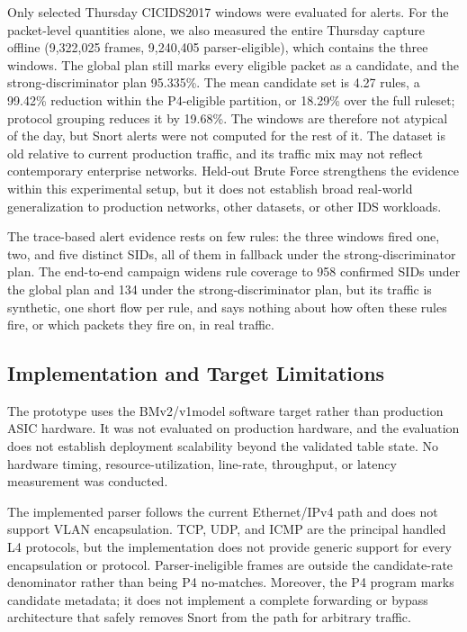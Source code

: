\documentclass{article}
\begin{document}
Only selected Thursday CICIDS2017 windows were evaluated for alerts. For the
packet-level quantities alone, we also measured the entire Thursday capture
offline (9,322,025 frames, 9,240,405 parser-eligible), which contains the
three windows. The global plan still marks every eligible packet as a
candidate, and the strong-discriminator plan 95.335\%. The mean candidate set
is 4.27 rules, a 99.42\% reduction within the P4-eligible partition, or
18.29\% over the full ruleset; protocol grouping reduces it by 19.68\%. The
windows are therefore not atypical of the day, but Snort alerts were not
computed for the rest of it. The dataset is old relative to current
production traffic, and its traffic mix may not reflect contemporary
enterprise networks. Held-out Brute Force strengthens the evidence within
this experimental setup, but it does not establish broad real-world
generalization to production networks, other datasets, or other IDS
workloads.

The trace-based alert evidence rests on few rules: the three windows fired
one, two, and five distinct SIDs, all of them in fallback under the
strong-discriminator plan. The end-to-end campaign widens rule coverage to
958 confirmed SIDs under the global plan and 134 under the
strong-discriminator plan, but its traffic is synthetic, one short flow per
rule, and says nothing about how often these rules fire, or which packets
they fire on, in real traffic.

\subsection{Implementation and Target Limitations}
The prototype uses the BMv2/v1model software target rather than production
ASIC hardware. It was not evaluated on production hardware, and the
evaluation does not establish deployment scalability beyond the validated
table state. No hardware timing, resource-utilization, line-rate, throughput,
or latency measurement was conducted.

The implemented parser follows the current Ethernet/IPv4 path and does not
support VLAN encapsulation. TCP, UDP, and ICMP are the principal handled L4
protocols, but the implementation does not provide generic support for every
encapsulation or protocol. Parser-ineligible frames are outside the
candidate-rate denominator rather than being P4 no-matches. Moreover, the P4
program marks candidate metadata; it does not implement a complete forwarding
or bypass architecture that safely removes Snort from the path for arbitrary
traffic.
\end{document}
